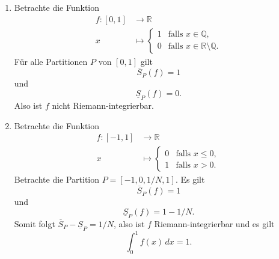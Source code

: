 \documentclass[../main.tex]{subfiles}
\begin{document}
\begin{examples}
  \leavevmode
  \begin{enumerate}[(1)]
    \item Betrachte die Funktion
      \begin{align*}
        f \colon [0, 1] & \to \mathbb{R} \\
        x & \mapsto 
        \begin{cases}
          1 & \text{falls $x \in \mathbb{Q}$},\\
          0 & \text{falls $x \in \mathbb{R} \setminus \mathbb{Q}$}.
        \end{cases}
      \end{align*}
      Für alle Partitionen $P$ von $[0, 1]$ gilt
      \[
        \overline S_P(f) = 1
      \]
      und
      \[
        \underline S_P(f) = 0.
      \]
      Also ist $f$ nicht Riemann-integrierbar.
    \item Betrachte die Funktion
      \begin{align*}
        f \colon [-1, 1] & \to \mathbb{R} \\
        x & \mapsto 
        \begin{cases}
          0 & \text{falls $x \leq 0$},\\
          1 & \text{falls $x > 0$}.
        \end{cases}
      \end{align*}
      Betrachte die Partition
      $P = [-1, 0, 1/N, 1]$.
      Es gilt
      \[
        \overline S_P(f) = 1
      \]
      und
      \[
        \underline S_P(f) = 1 - 1/N.
      \] 
      Somit folgt $\overline S_P - \underline S_P = 1/N$,
      also ist $f$ Riemann-integrierbar und es gilt
      \[
        \int_{0}^{1} f(x) \, dx = 1.
      \]
  \end{enumerate}
  
\end{examples}
\end{document}
